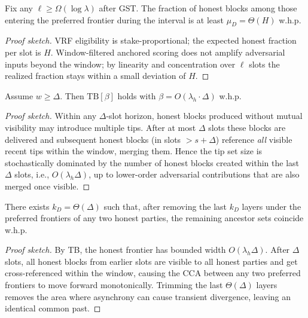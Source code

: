 \begin{theorem}
\label{thm:base-DQ}
Fix any $\ell\ge \Omega(\log\lambda)$ after GST. The fraction of honest blocks among those entering the preferred frontier during the interval is at least $\mu_D=\Theta(H)$ w.h.p.
\end{theorem}
\begin{proof}[Proof sketch]
VRF eligibility is stake-proportional; the expected honest fraction per slot is $H$. Window-filtered anchored scoring does not amplify adversarial inputs beyond the window; by linearity and concentration over $\ell$ slots the realized fraction stays within a small deviation of $H$.
\end{proof}

\begin{theorem}
\label{thm:base-TB}
Assume $w\ge \Delta$. Then $\mathrm{TB}[\beta]$ holds with $\beta=O(\lambda_h\cdot \Delta)$ w.h.p.
\end{theorem}
\begin{proof}[Proof sketch]
Within any $\Delta$-slot horizon, honest blocks produced without mutual visibility may introduce multiple tips. After at most $\Delta$ slots these blocks are delivered and subsequent honest blocks (in slots $>s{+}\Delta$) reference \emph{all} visible recent tips within the window, merging them. Hence the tip set size is stochastically dominated by the number of honest blocks created within the last $\Delta$ slots, i.e., $O(\lambda_h\Delta)$, up to lower-order adversarial contributions that are also merged once visible.
\end{proof}

\begin{theorem}
\label{thm:base-DCP}
There exists $k_D=\Theta(\Delta)$ such that, after removing the last $k_D$ layers under the preferred frontiers of any two honest parties, the remaining ancestor sets coincide w.h.p.
\end{theorem}
\begin{proof}[Proof sketch]
By TB, the honest frontier has bounded width $O(\lambda_h\Delta)$. After $\Delta$ slots, all honest blocks from earlier slots are visible to all honest parties and get cross-referenced within the window, causing the CCA between any two preferred frontiers to move forward monotonically. Trimming the last $\Theta(\Delta)$ layers removes the area where asynchrony can cause transient divergence, leaving an identical common past.
\end{proof}


